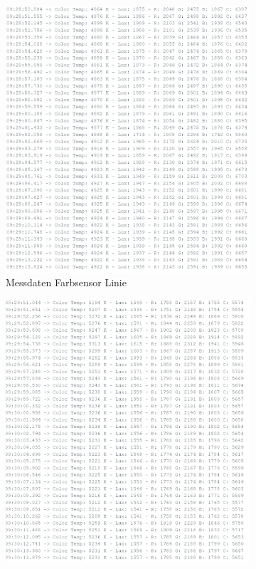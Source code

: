 \begin{figure}[H]
    \centering
    \begin{subfigure}{0.45\textwidth} %
        \centering
        \includegraphics[width=\linewidth]{img/sensortest/MD_Linie.png}
        \caption{Messdaten Farbsensor Linie}
        \label{fig:MDFarbsensorLinie}
    \end{subfigure}
    \begin{subfigure}{0.45\textwidth}
        \centering
        \includegraphics[width=\linewidth]{img/sensortest/MD_WeisserPunkt.png}

\end{subfigure}
\end{figure}
